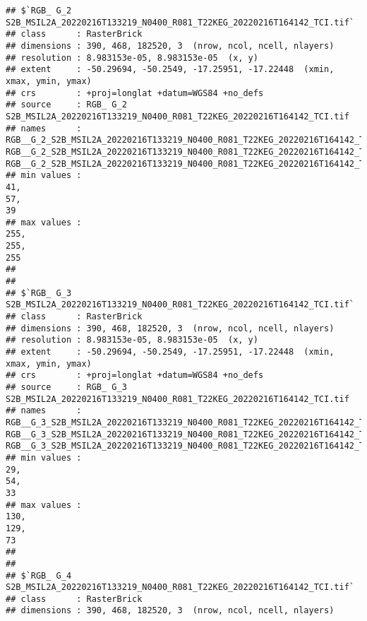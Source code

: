 \documentclass[
]{article}
\begin{document}
\begin{verbatim}
## $`RGB_ G_2 S2B_MSIL2A_20220216T133219_N0400_R081_T22KEG_20220216T164142_TCI.tif`
## class      : RasterBrick 
## dimensions : 390, 468, 182520, 3  (nrow, ncol, ncell, nlayers)
## resolution : 8.983153e-05, 8.983153e-05  (x, y)
## extent     : -50.29694, -50.2549, -17.25951, -17.22448  (xmin, xmax, ymin, ymax)
## crs        : +proj=longlat +datum=WGS84 +no_defs 
## source     : RGB_ G_2 S2B_MSIL2A_20220216T133219_N0400_R081_T22KEG_20220216T164142_TCI.tif 
## names      : RGB__G_2_S2B_MSIL2A_20220216T133219_N0400_R081_T22KEG_20220216T164142_TCI.1, RGB__G_2_S2B_MSIL2A_20220216T133219_N0400_R081_T22KEG_20220216T164142_TCI.2, RGB__G_2_S2B_MSIL2A_20220216T133219_N0400_R081_T22KEG_20220216T164142_TCI.3 
## min values :                                                                          41,                                                                          57,                                                                          39 
## max values :                                                                         255,                                                                         255,                                                                         255 
## 
## 
## $`RGB_ G_3 S2B_MSIL2A_20220216T133219_N0400_R081_T22KEG_20220216T164142_TCI.tif`
## class      : RasterBrick 
## dimensions : 390, 468, 182520, 3  (nrow, ncol, ncell, nlayers)
## resolution : 8.983153e-05, 8.983153e-05  (x, y)
## extent     : -50.29694, -50.2549, -17.25951, -17.22448  (xmin, xmax, ymin, ymax)
## crs        : +proj=longlat +datum=WGS84 +no_defs 
## source     : RGB_ G_3 S2B_MSIL2A_20220216T133219_N0400_R081_T22KEG_20220216T164142_TCI.tif 
## names      : RGB__G_3_S2B_MSIL2A_20220216T133219_N0400_R081_T22KEG_20220216T164142_TCI.1, RGB__G_3_S2B_MSIL2A_20220216T133219_N0400_R081_T22KEG_20220216T164142_TCI.2, RGB__G_3_S2B_MSIL2A_20220216T133219_N0400_R081_T22KEG_20220216T164142_TCI.3 
## min values :                                                                          29,                                                                          54,                                                                          33 
## max values :                                                                         130,                                                                         129,                                                                          73 
## 
## 
## $`RGB_ G_4 S2B_MSIL2A_20220216T133219_N0400_R081_T22KEG_20220216T164142_TCI.tif`
## class      : RasterBrick 
## dimensions : 390, 468, 182520, 3  (nrow, ncol, ncell, nlayers)

\end{verbatim}
\end{document}
